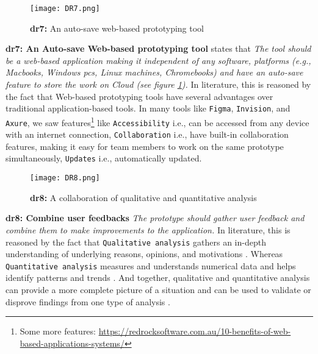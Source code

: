 \begin{figure}[htbp!]
  \centering    
  \texttt{[image: DR7.png]}
  \caption[Web-based tool]{\textbf{\ac{dr}7:} An auto-save web-based prototyping tool}
  \label{fig:design:dr7}
\end{figure}
\textbf{\ac{dr}7: An Auto-save Web-based prototyping tool} states that \textit{The tool should be a web-based application making it independent of any software, platforms (e.g., Macbooks, Windows \ac{pc}s, Linux machines, Chromebooks) and have an auto-save feature to store the work on Cloud (see figure \ref{fig:design:dr7}).}
In literature, this is reasoned by the fact that Web-based prototyping tools have several advantages \cite{misc:cloud} over traditional application-based tools.
In many tools like \texttt{Figma}, \texttt{Invision}, and \texttt{Axure}, we saw features\footnote{Some more features: \url{https://redrocksoftware.com.au/10-benefits-of-web-based-applications-systems/}} like \texttt{Accessibility} i.e., can be accessed from any device with an internet connection, \texttt{Collaboration} i.e., have built-in collaboration features, making it easy for team members to work on the same prototype simultaneously, \texttt{Updates} i.e., automatically updated.

\begin{figure}[htbp!]
  \centering    
  \texttt{[image: DR8.png]}
  \caption[Combine user feedbacks]{\textbf{\ac{dr}8:} A collaboration of qualitative and quantitative analysis}
  \label{fig:design:dr8}
\end{figure}
\textbf{\ac{dr}8: Combine user feedbacks} \textit{The prototype should gather user feedback and combine them to make improvements to the application.} 
In literature, this is reasoned by the fact that \texttt{Qualitative analysis} gathers an in-depth understanding of underlying reasons, opinions, and motivations \cite{misc:dsr:mayring}.
Whereas \texttt{Quantitative analysis} measures and understands numerical data and helps identify patterns and trends \cite{article:qqa:young}.
And together, qualitative and quantitative analysis can provide a more complete picture of a situation and can be used to validate or disprove findings from one type of analysis \cite{article:qq:helena}.

